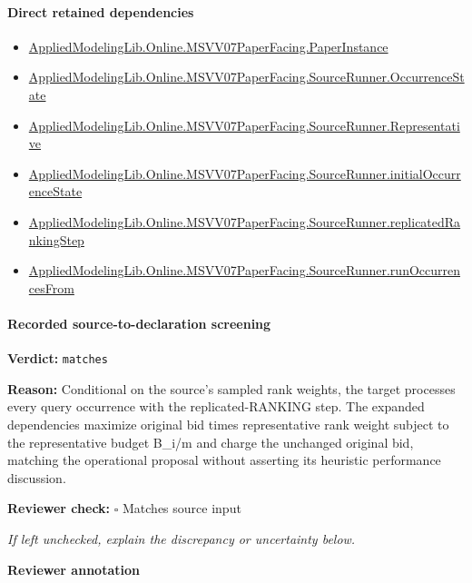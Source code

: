 \documentclass[10pt]{article}
\newcommand{\reviewerbox}{%
  \par\noindent\fbox{\parbox{0.96\linewidth}{\rule{0pt}{0.38in}}}\par
}
\newcommand{\reviewmatch}[1]{%
  \par\noindent\textbf{Reviewer check:} $\square$\; #1\par
  \noindent\emph{If left unchecked, explain the discrepancy or uncertainty below.}\par
}
\begin{document}
\paragraph{Direct retained dependencies}
\begin{itemize}\raggedright
\item \hyperlink{governing-declaration-11907576ec71eeb5}{Applied\allowbreak{}Modeling\allowbreak{}Lib.\allowbreak{}Online.\allowbreak{}MSVV07\allowbreak{}Paper\allowbreak{}Facing.\allowbreak{}Paper\allowbreak{}Instance}
\item \hyperlink{governing-declaration-2eff7815f49c1d41}{Applied\allowbreak{}Modeling\allowbreak{}Lib.\allowbreak{}Online.\allowbreak{}MSVV07\allowbreak{}Paper\allowbreak{}Facing.\allowbreak{}Source\allowbreak{}Runner.\allowbreak{}Occurrence\allowbreak{}State}
\item \hyperlink{governing-declaration-49a2a5677e1a3800}{Applied\allowbreak{}Modeling\allowbreak{}Lib.\allowbreak{}Online.\allowbreak{}MSVV07\allowbreak{}Paper\allowbreak{}Facing.\allowbreak{}Source\allowbreak{}Runner.\allowbreak{}Representative}
\item \hyperlink{governing-declaration-e173eeda3926c5ec}{Applied\allowbreak{}Modeling\allowbreak{}Lib.\allowbreak{}Online.\allowbreak{}MSVV07\allowbreak{}Paper\allowbreak{}Facing.\allowbreak{}Source\allowbreak{}Runner.\allowbreak{}initial\allowbreak{}Occurrence\allowbreak{}State}
\item \hyperlink{governing-declaration-27a1c86efe6e20e7}{Applied\allowbreak{}Modeling\allowbreak{}Lib.\allowbreak{}Online.\allowbreak{}MSVV07\allowbreak{}Paper\allowbreak{}Facing.\allowbreak{}Source\allowbreak{}Runner.\allowbreak{}replicated\allowbreak{}Ranking\allowbreak{}Step}
\item \hyperlink{governing-declaration-7f435ae50ae781b1}{Applied\allowbreak{}Modeling\allowbreak{}Lib.\allowbreak{}Online.\allowbreak{}MSVV07\allowbreak{}Paper\allowbreak{}Facing.\allowbreak{}Source\allowbreak{}Runner.\allowbreak{}run\allowbreak{}Occurrences\allowbreak{}From}
\end{itemize}
\paragraph{Recorded source-to-declaration screening}
\textbf{Verdict:} \texttt{matches}
\\
{\raggedright
\textbf{Reason:} Conditional on the source's sampled rank weights, the target processes every query occurrence with the replicated-\allowbreak{}RANKING step.\allowbreak{} The expanded dependencies maximize original bid times representative rank weight subject to the representative budget B\_\allowbreak{}i/\allowbreak{}m and charge the unchanged original bid, matching the operational proposal without asserting its heuristic performance discussion.\allowbreak{}
\par}
\reviewmatch{Matches source input}
\noindent\textbf{Reviewer annotation}\par
\reviewerbox
\clearpage
\hypertarget{paper-prerequisite-ecec1d4ea1517219}{}
\end{document}
